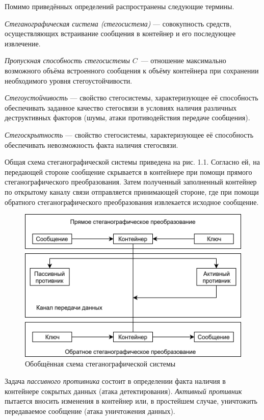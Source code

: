 Помимо приведённых определений распространены следующие термины.

\textit{Стеганографическая система (стегосистема)} --- совокупность средств, осуществляющих встраивание сообщения в контейнер и его последующее извлечение.

\textit{Пропускная способность стегосистемы} $ C $~--- отношение максимально возможного объёма встроенного сообщения к объёму контейнера при сохранении необходимого уровня стегоустойчивости.

\textit{Стегоустойчивость} --- свойство стегосистемы, характеризующее её способность обеспечивать заданное качество стегосвязи в условиях наличия различных деструктивных факторов (шумы, атаки противодействия передаче сообщения).

\textit{Стегоскрытность} --- свойство стегосистемы, характеризующее её способность обеспечивать невозможность факта наличия стегосвязи.

Общая схема стеганографической системы приведена на рис. 1.1. Согласно ей, на передающей стороне сообщение скрывается в контейнере при помощи прямого стеганографического преобразования. Затем полученный заполненный контейнер по открытому каналу связи отправляется принимающей стороне, где при помощи обратного стеганографического преобразования извлекается исходное сообщение.

\begin{figure}
\centering
\includegraphics[width=1\textwidth]{include/graphics/stego_system_scheme}
\caption{Обобщённая схема стеганографической системы}
\label{fig:StegoSystem}
\end{figure}

Задача \textit{пассивного противника} состоит в определении факта наличия в контейнере сокрытых данных (атака детектирования). \textit{Активный противник} пытается вносить изменения в контейнер или, в простейшем случае, уничтожить передаваемое сообщение (атака уничтожения данных).

